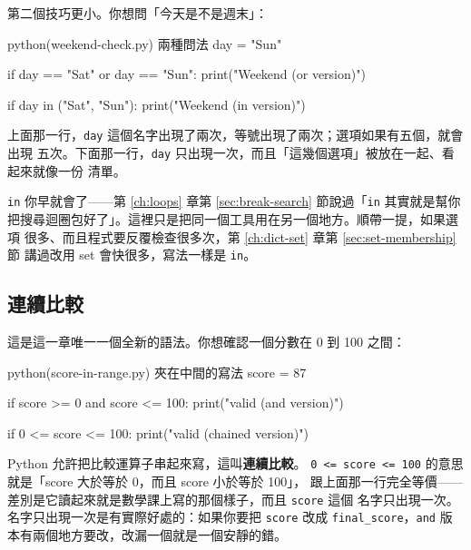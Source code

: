 第二個技巧更小。你想問「今天是不是週末」：

\begin{example}{python}{(weekend-check.py) 兩種問法}
day = "Sun"

if day == "Sat" or day == "Sun":
    print("Weekend (or version)")

if day in ("Sat", "Sun"):
    print("Weekend (in version)")
\end{example}


上面那一行，\texttt{day} 這個名字出現了兩次，等號出現了兩次；選項如果有五個，就會出現
五次。下面那一行，\texttt{day} 只出現一次，而且「這幾個選項」被放在一起、看起來就像一份
清單。

\texttt{in} 你早就會了——第 \ref{ch:loops} 章第 \ref{sec:break-search} 節說過「\texttt{in}
其實就是幫你把搜尋迴圈包好了」。這裡只是把同一個工具用在另一個地方。順帶一提，如果選項
很多、而且程式要反覆檢查很多次，第 \ref{ch:dict-set} 章第 \ref{sec:set-membership} 節
講過改用 set 會快很多，寫法一樣是 \texttt{in}。

\subsection*{連續比較}

這是這一章唯一一個全新的語法。你想確認一個分數在 0 到 100 之間：

\begin{example}{python}{(score-in-range.py) 夾在中間的寫法}
score = 87

if score >= 0 and score <= 100:
    print("valid (and version)")

if 0 <= score <= 100:
    print("valid (chained version)")
\end{example}


Python 允許把比較運算子串起來寫，這叫\textbf{連續比較}。
\texttt{0 <= score <= 100} 的意思就是「score 大於等於 0，而且 score 小於等於 100」，
跟上面那一行完全等價——差別是它讀起來就是數學課上寫的那個樣子，而且 \texttt{score} 這個
名字只出現一次。名字只出現一次是有實際好處的：如果你要把 \texttt{score} 改成
\texttt{final\_score}，\texttt{and} 版本有兩個地方要改，改漏一個就是一個安靜的錯。


